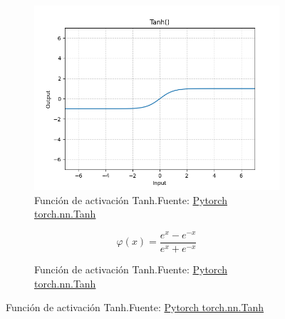 \begin{figure}[H]
    \medskip
    \begin{subfigure}{.475\linewidth}
        \centering
        \includegraphics[width=0.75\linewidth]{figures/equations/Tanh.png}
        \caption{Función de activación Tanh.\newline{}Fuente: \href{https://pytorch.org/docs/stable/generated/torch.nn.Tanh.html}{Pytorch torch.nn.Tanh}}
        \label{subfig:torch.nn.Tanh}
    \end{subfigure}\hfill
    \begin{subfigure}{.475\linewidth}
        \centering
        \begin{equation*} \varphi(x) = \frac{e^{x}-e^{-x}}{e^{x}+e^{-x}} \end{equation*}
        \caption{Función de activación Tanh.\newline{}Fuente: \href{https://pytorch.org/docs/stable/generated/torch.nn.Tanh.html}{Pytorch torch.nn.Tanh}}
        \label{subfig:eq-torch.nn.Tanh}
    \end{subfigure}


\end{figure}
